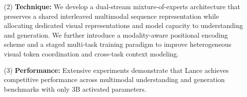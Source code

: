 (2) \textbf{Technique:}
We develop a dual-stream mixture-of-experts architecture that preserves a shared interleaved multimodal sequence representation while allocating dedicated visual representations and model capacity to understanding and generation. We further introduce a modality-aware positional encoding scheme and a staged multi-task training paradigm to improve heterogeneous visual token coordination and cross-task context modeling.

(3) \textbf{Performance:} Extensive experiments demonstrate that Lance achieves competitive performance across multimodal understanding and generation benchmarks with only $3$B activated parameters. 





